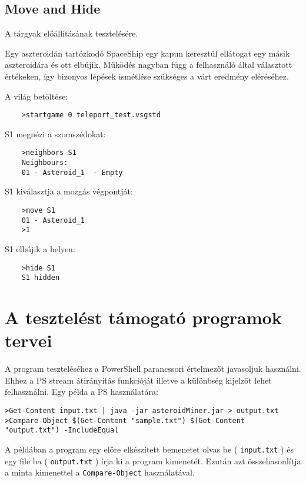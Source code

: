 \documentclass[../../projlab]{subfiles}
\begin{document}
\subsection{Move and Hide}
\begin{test-case-description}
    A tárgyak előállításának tesztelésére.
\end{test-case-description}
\begin{test-case-function}
    Egy aszteroidán tartózkodó SpaceShip egy kapun keresztül ellátogat egy másik aszteroidára és ott elbújik. \newline
    Működés nagyban függ a felhasználó által választott értékeken, így bizonyos lépések ismétlése szükséges a várt eredmény eléréséhez.
\end{test-case-function}
\begin{test-case-input}

    A világ betöltése: 
    \begin{verbatim}
    >startgame 0 teleport_test.vsgstd
    \end{verbatim}
    S1 megnézi a szomszédokat:
    \begin{verbatim}
    >neighbors S1
    Neighbours:
    01 - Asteroid_1  - Empty
    \end{verbatim}
    S1 kiválasztja a mozgás végpontját:
    \begin{verbatim}
    >move S1
    01 - Asteroid_1
    >1
    \end{verbatim}
    S1 elbújik a helyen:
    \begin{verbatim}
    >hide S1
    S1 hidden
    \end{verbatim}
\end{test-case-input}
\begin{test-case-output}

\end{test-case-output}

\section{A tesztelést támogató programok tervei}
A program teszteléséhez a PowerShell parancssori értelmezőt javasoljuk használni.
Ehhez a PS stream átirányítás funkcióját illetve a különbség kijelzőt lehet felhasználni.
Egy példa a PS használatára:

\begin{adjustwidth}{-30pt}{0pt}
\begin{verbatim}
>Get-Content input.txt | java -jar asteroidMiner.jar > output.txt
>Compare-Object $(Get-Content "sample.txt") $(Get-Content "output.txt") -IncludeEqual
\end{verbatim}
\end{adjustwidth}

A példában a program egy előre elkészített bemenetet olvas be ( \verb"input.txt" )
és egy file ba ( \verb"output.txt" ) írja ki a program kimenetét.
Ezután azt összehasonlítja a minta kimenettel a \verb"Compare-Object" használatával.
\end{document}
